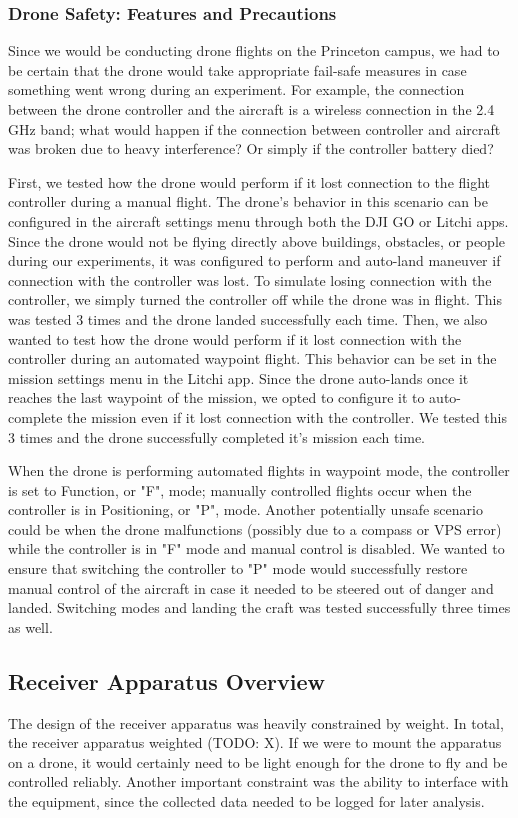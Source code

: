 \documentclass[pageno]{jpaper}
\begin{document}
\subsubsection{Drone Safety: Features and Precautions}
Since we would be conducting drone flights on the Princeton campus, we had to be certain that the drone would take appropriate fail-safe measures in case something went wrong during an experiment. For example, the connection between the drone controller and the aircraft is a wireless connection in the 2.4 GHz band; what would happen if the connection between controller and aircraft was broken due to heavy interference? Or simply if the controller battery died?

First, we tested how the drone would perform if it lost connection to the flight controller during a manual flight. The drone's behavior in this scenario can be configured in the aircraft settings menu through both the DJI GO or Litchi apps. Since the drone would not be flying directly above buildings, obstacles, or people during our experiments, it was configured to perform and auto-land maneuver if connection with the controller was lost. To simulate losing connection with the controller, we simply turned the controller off while the drone was in flight. This was tested 3 times and the drone landed successfully each time. Then, we also wanted to test how the drone would perform if it lost connection with the controller during an automated waypoint flight. This behavior can be set in the mission settings menu in the Litchi app. Since the drone auto-lands once it reaches the last waypoint of the mission, we opted to configure it to auto-complete the mission even if it lost connection with the controller. We tested this 3 times and the drone successfully completed it's mission each time. 

When the drone is performing automated flights in waypoint mode, the controller is set to Function, or "F", mode; manually controlled flights occur when the controller is in Positioning, or "P", mode. Another potentially unsafe scenario could be when the drone malfunctions (possibly due to a compass or VPS error) while the controller is in "F" mode and manual control is disabled. We wanted to ensure that switching the controller to "P" mode would successfully restore manual control of the aircraft in case it needed to be steered out of danger and landed. Switching modes and landing the craft was tested successfully three times as well.

\subsection{Receiver Apparatus Overview}
The design of the receiver apparatus was heavily constrained by weight. In total, the receiver apparatus weighted (TODO: X). If we were to mount the apparatus on a drone, it would certainly need to be light enough for the drone to fly and be controlled reliably. Another important constraint was the ability to interface with the equipment, since the collected data needed to be logged for later analysis.
\end{document}
